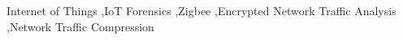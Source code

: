 \documentclass[preprint,12pt]{elsarticle}
\begin{document}
\begin{frontmatter}


\begin{keyword}
Internet of Things \sep IoT Forensics \sep Zigbee \sep Encrypted Network Traffic Analysis \sep Network Traffic Compression


\end{keyword}

\end{frontmatter}
\end{document}
